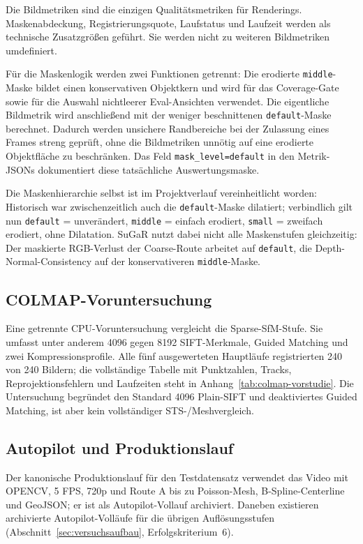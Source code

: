 Die Bildmetriken sind die einzigen Qualitätsmetriken für Renderings.
Maskenabdeckung, Registrierungsquote, Laufstatus und Laufzeit werden als
technische Zusatzgrößen geführt. Sie werden nicht zu weiteren Bildmetriken
umdefiniert.

Für die Maskenlogik werden zwei Funktionen getrennt: Die erodierte
\texttt{middle}-Maske bildet einen konservativen Objektkern und wird für das
Coverage-Gate sowie für die Auswahl nichtleerer Eval-Ansichten verwendet. Die
eigentliche Bildmetrik wird anschließend mit der weniger beschnittenen
\texttt{default}-Maske berechnet. Dadurch werden unsichere Randbereiche bei
der Zulassung eines Frames streng geprüft, ohne die Bildmetriken unnötig auf
eine erodierte Objektfläche zu beschränken. Das Feld
\texttt{mask\_level=default} in den Metrik-JSONs dokumentiert diese tatsächliche
Auswertungsmaske.

Die Maskenhierarchie selbst ist im Projektverlauf vereinheitlicht worden:
Historisch war zwischenzeitlich auch die \texttt{default}-Maske dilatiert;
verbindlich gilt nun \texttt{default} = unverändert, \texttt{middle} = einfach
erodiert, \texttt{small} = zweifach erodiert, ohne Dilatation. SuGaR nutzt
dabei nicht alle Maskenstufen gleichzeitig: Der maskierte RGB-Verlust der
Coarse-Route arbeitet auf \texttt{default}, die Depth-Normal-Consistency auf
der konservativeren \texttt{middle}-Maske.

\subsection{COLMAP-Voruntersuchung}

Eine getrennte CPU-Voruntersuchung vergleicht die Sparse-SfM-Stufe. Sie umfasst
unter anderem 4096 gegen 8192 SIFT-Merkmale, Guided Matching und zwei
Kompressionsprofile. Alle fünf ausgewerteten Hauptläufe registrierten 240 von
240 Bildern; die vollständige Tabelle mit Punktzahlen, Tracks,
Reprojektionsfehlern und Laufzeiten steht in
Anhang~\ref{tab:colmap-vorstudie}. Die Untersuchung begründet den Standard
4096 Plain-SIFT und deaktiviertes Guided Matching, ist aber kein
vollständiger STS-/Meshvergleich.

\subsection{Autopilot und Produktionslauf}

Der kanonische Produktionslauf für den Testdatensatz verwendet das Video
 mit OPENCV, 5 FPS, 720p und Route A bis zu Poisson-Mesh,
B-Spline-Centerline und GeoJSON; er ist als Autopilot-Vollauf archiviert.
Daneben existieren archivierte Autopilot-Volläufe für die übrigen
Auflösungsstufen (Abschnitt~\ref{sec:versuchsaufbau}, Erfolgskriterium~6).

